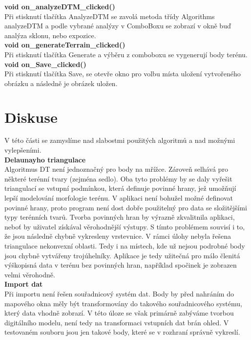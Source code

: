 \documentclass[a4paper,11pt,twoside]{article}
\begin{document}
\noindent\textbf{void on\_analyzeDTM\_clicked()}\\
Při stisknutí tlačítka AnalyzeDTM se zavolá metoda třídy Algorithms analyzeDTM a podle vybrané analýzy v ComboBoxu se zobrazí v okně buď analýza sklonu, nebo expozice. \\

\noindent\textbf{void on\_generateTerrain\_clicked()}\\
Při stisknutí tlačítka Generate a výběru z comboboxu se vygenerují body terénu.\\

\noindent\textbf{void on\_Save\_clicked()}\\
Při stisknutí tlačítka Save, se otevře okno pro volbu místa uložení vytvořeného obrázku a následně je obrázek uložen.



\newpage
{}

\vspace*{-1cm}
\section*{Diskuse}
V této části se zamyslíme nad slabostmi použitých algoritmů a nad možnými vylepšeními. \\

\noindent\textbf{Delaunayho triangulace}\\
\noindent Algoritmus DT není jednoznačný pro body na mřížce. Zároveň selhává pro některé terénní tvary (zejména sedlo). Oba tyto problémy by se daly vyřešit triangulací se vstupní podmínkou, která definuje povinné hrany, jež umožňují lepší modelování morfologie terénu. V aplikaci není bohužel možné definovat povinné hrany, proto program není dost dobře použitelný pro data se složitějšími typy terénních tvarů. Tvorba povinných hran by výrazně zkvalitnila aplikaci, neboť by uživatel získával věrohodnější výstupy. S tímto problémem souvisí i to, že jsou následně chybně vykresleny vrstevnice. V rámci úlohy nebyla řešena triangulace nekonvexní oblasti. Tedy i na místech, kde už nejsou podrobné body jsou chybně vytvářeny trojúhelníky. Aplikace je tedy užitečná pro málo členitá výškopisná data v terénu bez povinných hran, například spočinek je zobrazen velmi věrohodně.\\

\noindent\textbf{Import dat}\\
\noindent Při importu není řešen souřadnicový systém dat. Body by před nahráním do mapového okna měly být transformovány do takového souřadnicového systému, který data vhodně zobrazí. V této úloze se však primárně zabýváme tvorbou digitálního modelu, není tedy na transformaci vstupních dat brán ohled. V testovaném souboru jsou jen takové body, které se v rozhraní správně vykreslí. \\
\end{document}
